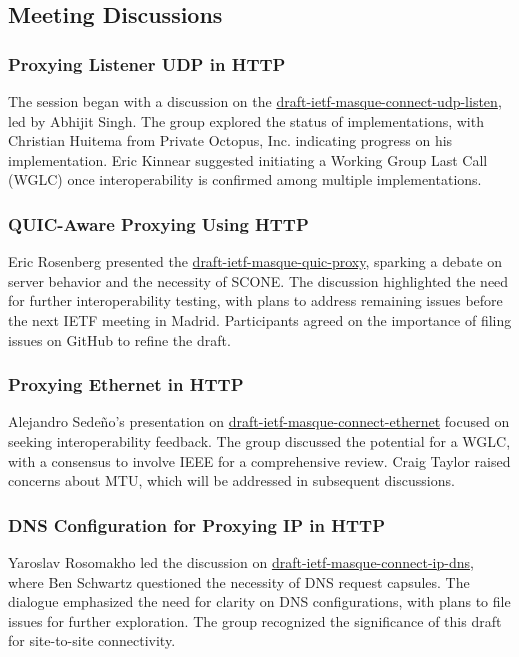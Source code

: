 \documentclass{article}
\begin{document}
\subsection{Meeting Discussions}

\subsubsection{Proxying Listener UDP in HTTP}
The session began with a discussion on the \href{https://datatracker.ietf.org/doc/html/draft-ietf-masque-connect-udp-listen}{draft-ietf-masque-connect-udp-listen}, led by Abhijit Singh. The group explored the status of implementations, with Christian Huitema from Private Octopus, Inc. indicating progress on his implementation. Eric Kinnear suggested initiating a Working Group Last Call (WGLC) once interoperability is confirmed among multiple implementations.

\subsubsection{QUIC-Aware Proxying Using HTTP}
Eric Rosenberg presented the \href{https://datatracker.ietf.org/doc/html/draft-ietf-masque-quic-proxy}{draft-ietf-masque-quic-proxy}, sparking a debate on server behavior and the necessity of SCONE. The discussion highlighted the need for further interoperability testing, with plans to address remaining issues before the next IETF meeting in Madrid. Participants agreed on the importance of filing issues on GitHub to refine the draft.

\subsubsection{Proxying Ethernet in HTTP}
Alejandro Sedeño's presentation on \href{https://datatracker.ietf.org/doc/html/draft-ietf-masque-connect-ethernet}{draft-ietf-masque-connect-ethernet} focused on seeking interoperability feedback. The group discussed the potential for a WGLC, with a consensus to involve IEEE for a comprehensive review. Craig Taylor raised concerns about MTU, which will be addressed in subsequent discussions.

\subsubsection{DNS Configuration for Proxying IP in HTTP}
Yaroslav Rosomakho led the discussion on \href{https://datatracker.ietf.org/doc/html/draft-ietf-masque-connect-ip-dns}{draft-ietf-masque-connect-ip-dns}, where Ben Schwartz questioned the necessity of DNS request capsules. The dialogue emphasized the need for clarity on DNS configurations, with plans to file issues for further exploration. The group recognized the significance of this draft for site-to-site connectivity.
\end{document}
